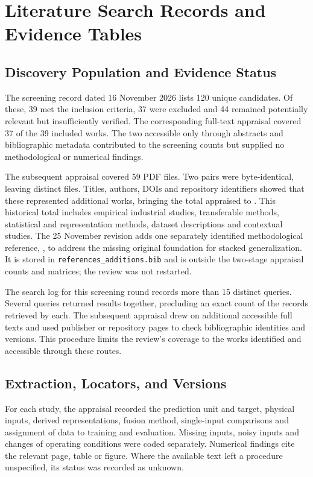 \chapter{Literature Search Records and Evidence Tables}
\label{app:literature}
\section{Discovery Population and Evidence Status}
The screening record dated 16 November 2026 lists 120 unique candidates. Of these, 39
met the inclusion criteria, 37 were excluded and 44 remained potentially relevant but
insufficiently verified. The corresponding full-text appraisal covered 37 of the 39
included works. The two accessible only through abstracts and bibliographic metadata
contributed to the screening counts but supplied no methodological or numerical
findings.

The subsequent appraisal covered 59 PDF files. Two pairs were byte-identical, leaving
\ExpandedPDFCount{} distinct files. Titles, authors, DOIs and repository identifiers
showed that these represented \ExpandedPDFCount{} additional works, bringing the total
appraised to \ReviewWorkCount{}. This historical total includes empirical industrial
studies, transferable methods, statistical and representation methods, dataset
descriptions and contextual studies. The 25 November revision adds one separately
identified methodological reference, \citet{Ting1999Issues}, to address the missing
original foundation for stacked generalization. It is stored in
\texttt{references\_additions.bib} and is outside the two-stage appraisal counts and
matrices; the review was not restarted.

The search log for this screening round records more than 15 distinct queries. Several
queries returned results together, precluding an exact count of the records retrieved by
each. The subsequent appraisal drew on additional accessible full texts and used
publisher or repository pages to check bibliographic identities and versions. This
procedure limits the review's coverage to the works identified and accessible through
these routes.

\section{Extraction, Locators, and Versions}
For each study, the appraisal recorded the prediction unit and target, physical inputs,
derived representations, fusion method, single-input comparisons and assignment of data
to training and evaluation. Missing inputs, noisy inputs and changes of operating
conditions were coded separately. Numerical findings cite the relevant page, table or
figure. Where the available text left a procedure unspecified, its status was recorded
as unknown.

